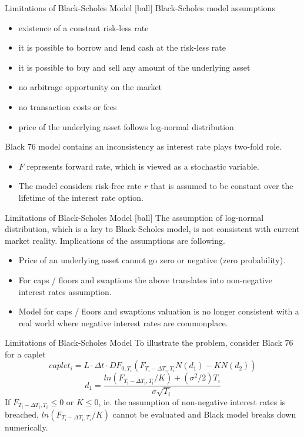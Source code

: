 \documentclass{beamer}
\begin{document}
\begin{frame}{Limitations of Black-Scholes Model}
[ball]
Black-Scholes model assumptions
\begin{itemize}
\item existence of a constant risk-less rate
\item it is possible to borrow and lend cash at the risk-less rate
\item it is possible to buy and sell any amount of the underlying asset
\item no arbitrage opportunity on the market
\item no transaction costs or fees
\item price of the underlying asset follows log-normal distribution
\end{itemize}
Black 76 model contains an inconsistency as interest rate plays two-fold role.
\begin{itemize}
\item $F$ represents forward rate, which is viewed as a stochastic variable.
\item The model considers risk-free rate $r$ that is assumed to be constant over the lifetime of the interest rate option.
\end{itemize}
\end{frame}

\begin{frame}{Limitations of Black-Scholes Model}
[ball]
The assumption of log-normal distribution, which is a key to Black-Scholes model, is not consistent with current market reality. Implications of the assumptions are following.
\begin{itemize}
\item Price of an underlying asset cannot go zero or negative (zero probability).
\item For caps / floors and swaptions the above translates into non-negative interest rates assumption.
\item Model for caps / floors and swaptions valuation is no longer consistent with a real world where negative interest rates are commonplace.
\end{itemize}
\end{frame}

\begin{frame}{Limitations of Black-Scholes Model}
To illustrate the problem, consider Black 76 for a caplet
\begin{equation}
caplet_i = L \cdot \Delta t \cdot DF_{0, T_i} \left(F_{T_i - \Delta T_i, T_i}N(d_1) - KN(d_2)\right)
\end{equation}
\begin{equation}
d_1 = \frac{ln(F_{T_i - \Delta T_i, T_i}/K) + (\sigma^2 / 2)T_i}{\sigma \sqrt{T_i}}
\end{equation}
If $F_{T_i - \Delta T_i, T_i} \le 0$ or $K \le 0$, ie. the assumption of non-negative interest rates is breached, $ln(F_{T_i - \Delta T_i, T_i}/K)$ cannot be evaluated and Black model breaks down numerically.
\end{frame}
\end{document}
